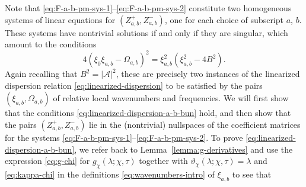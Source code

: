 Note that \eqref{eq:F-a-b-pm-sys-1}--\eqref{eq:F-a-b-pm-sys-2} 
constitute two homogeneous systems of linear equations for $(Z_{a,b}^+, Z_{a,b}^-)$, one for each choice of subscript $a$, $b$.
These systems have nontrivial solutions if and only if they are singular, which amount to the conditions
\begin{equation}
4 (\xi_0 \xi_{a,b}-\Omega_{a,b} )^2 = \xi_{a,b}^2 \left(\xi_{a,b}^2 - 4 B^2 \right).\label{eq:linearized-dispersion-a-b-bun}
\end{equation}
Again recalling that $B^2=|\mathcal{A}|^2$, these are precisely two instances of the linearized dispersion relation \eqref{eq:linearized-dispersion} to be satisfied by the pairs $(\xi_{a,b}, \Omega_{a,b})$ of relative local wavenumbers and frequencies. We will first show that the conditions \eqref{eq:linearized-dispersion-a-b-bun} hold, and then show that the pairs $(Z_{a,b}^+, Z_{a,b}^-)$
lie in the (nontrivial) nullspaces of the coefficient matrices for the systems \eqref{eq:F-a-b-pm-sys-1}--\eqref{eq:F-a-b-pm-sys-2}.
 To prove \eqref{eq:linearized-dispersion-a-b-bun},
we refer back to Lemma~\ref{lemma:g-derivatives} and use the expression \eqref{eq:g-chi} for $g_\chi(\lambda;\chi,\tau)$ together with $\vartheta_\chi(\lambda;\chi,\tau)=\lambda$ and \eqref{eq:kappa-chi} in the definitions \eqref{eq:wavenumbers-intro} of $\xi_{a,b}$ to see that

